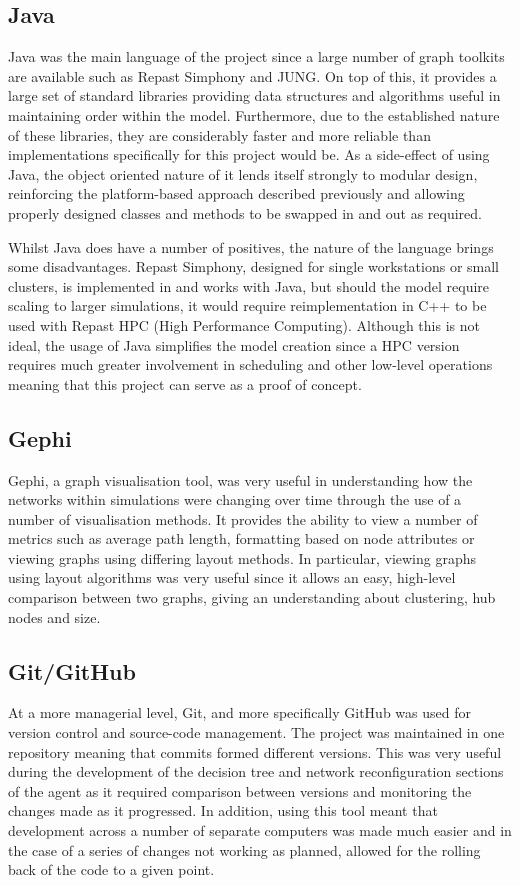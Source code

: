 \documentclass[]{report}
\begin{document}
\subsection{Java}
Java was the main language of the project since a large number of graph toolkits are available such as Repast Simphony and JUNG. On top of this, it provides a large set of standard libraries providing data structures and algorithms useful in maintaining order within the model. Furthermore, due to the established nature of these libraries, they are considerably faster and more reliable than implementations specifically for this project would be. As a side-effect of using Java, the object oriented nature of it lends itself strongly to modular design, reinforcing the platform-based approach described previously and allowing properly designed classes and methods to be swapped in and out as required.

Whilst Java does have a number of positives, the nature of the language brings some disadvantages. Repast Simphony, designed for single workstations or small clusters\cite{repast-simp}, is implemented in and works with Java, but should the model require scaling to larger simulations, it would require reimplementation in C++ to be used with Repast HPC (High Performance Computing)\cite{repast-HPC}. Although this is not ideal, the usage of Java simplifies the model creation since a HPC version requires much greater involvement in scheduling and other low-level operations meaning that this project can serve as a proof of concept.

\subsection{Gephi}
Gephi, a graph visualisation tool, was very useful in understanding how the networks within simulations were changing over time through the use of a number of visualisation methods. It provides the ability to view a number of metrics such as average path length, formatting based on node attributes or viewing graphs using differing layout methods. In particular, viewing graphs using layout algorithms was very useful since it allows an easy, high-level comparison between two graphs, giving an understanding about clustering, hub nodes and size.

\subsection{Git/GitHub}
At a more managerial level, Git, and more specifically GitHub was used for version control and source-code management. The project was maintained in one repository meaning that commits formed different versions. This was very useful during the development of the decision tree and network reconfiguration sections of the agent as it required comparison between versions and monitoring the changes made as it progressed. In addition, using this tool meant that development across a number of separate computers was made much easier and in the case of a series of changes not working as planned, allowed for the rolling back of the code to a given point.
\end{document}
